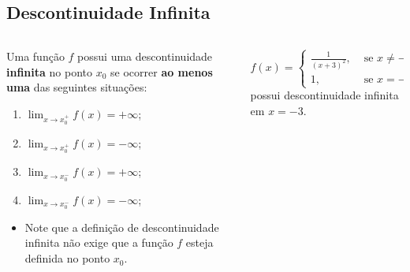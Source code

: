 \subsection{Descontinuidade Infinita}
\begin{frame}
  \begin{columns}[onlytextwidth]
    \begin{column}{0.49\textwidth}\vspace{-0.5cm}
      \begin{definition}
        Uma função $f$ possui uma descontinuidade \textbf{infinita} no ponto $x_{0}$ se ocorrer \textbf{ao menos uma} das seguintes situações:
        \begin{enumerate}
          \item $\displaystyle\lim_{x\to x_{0}^{+}}{f(x)} = +\infty$;
          \item $\displaystyle\lim_{x\to x_{0}^{+}}{f(x)} = -\infty$;
          \item $\displaystyle\lim_{x\to x_{0}^{-}}{f(x)} = +\infty$;
          \item $\displaystyle\lim_{x\to x_{0}^{-}}{f(x)} = -\infty$;
        \end{enumerate}
      \end{definition}
      \begin{itemize}
        \item Note que a definição de descontinuidade infinita não exige que a função $f$ esteja definida no ponto $x_{0}$.
      \end{itemize}
    \end{column}
    \begin{column}{0.49\textwidth}\vspace{-0.5cm}
      \begin{example-highlight}
        $\displaystyle f(x) = \begin{cases}
          \frac{1}{(x+3)^{2}},&\mbox{ se }x\not=-3 \\ 1,&\mbox{ se }x=-3
        \end{cases}$ possui descontinuidade infinita em $x=-3$.
      \end{example-highlight}
      \begin{figure}
      \end{figure}
    \end{column}
  \end{columns}
\end{frame}

